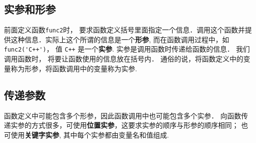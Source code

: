 \subsection{实参和形参}
前面定义函数\verb|func2|时， 要求函数定义括号里面指定一个信息．调用这个函数并提供这种信息．实际上这个所谓的信息是一个\textbf{形参}, 而在函数调用过程中，如\verb|func2('C++')|， 值 \verb|C++| 是一个\textbf{实参}. 实参是调用函数时传递给函数的信息． 我们调用函数时， 将要让函数使用的信息放在括号内． 通俗的说，将函数定义中的变量称为形参，将函数调用中的变量称为实参.

\subsection{传递参数}
函数定义中可能包含多个形参，因此函数调用中也可能包含多个实参． 向函数传递实参的方式很多，可使用\textbf{位置实参}，这要求实参的顺序与形参的顺序相同； 也可使用\textbf{关键字实参}, 其中每个实参都由变量名和值组成.